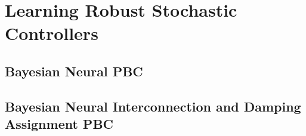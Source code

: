 \section{Learning Robust Stochastic Controllers}
\label{sec:bl_methods}

\subsection{Bayesian Neural PBC}
\subsection{Bayesian Neural Interconnection and Damping Assignment PBC}

